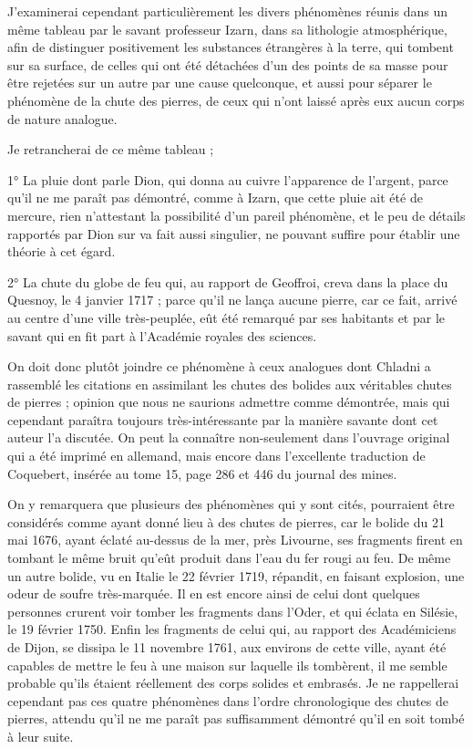 \documentclass[a4paper, 12pt, oneside, french]{article}
\begin{document}
J'examinerai cependant particulièrement les divers phénomènes réunis dans un même tableau par le savant professeur Izarn, dans sa lithologie atmosphérique, afin de distinguer positivement les substances étrangères à la terre, qui tombent sur sa surface, de celles qui ont été détachées d'un des points de sa masse pour être rejetées sur un autre par une cause quelconque, et aussi pour séparer le phénomène de la chute des pierres, de ceux qui n'ont laissé après eux aucun corps de nature analogue.

Je retrancherai de ce même tableau ;

1° La pluie dont parle Dion, qui donna au cuivre l'apparence de l'argent, parce qu'il ne me paraît pas démontré, comme à Izarn, que cette pluie ait été de mercure, rien n'attestant la possibilité d'un pareil phénomène, et le peu de détails rapportés par Dion sur va fait aussi singulier, ne pouvant suffire pour établir une théorie à cet égard.

2° La chute du globe de feu qui, au rapport de Geoffroi, creva dans la place du Quesnoy, le 4 janvier 1717 ; parce qu'il ne lança aucune pierre, car ce fait, arrivé au centre d'une ville très-peuplée, eût été remarqué par ses habitants et par le savant qui en fit part à l'Académie royales des sciences.

On doit donc plutôt joindre ce phénomène à ceux analogues dont Chladni a rassemblé les citations en assimilant les chutes des bolides aux véritables chutes de pierres ; opinion que nous ne saurions admettre comme démontrée, mais qui cependant paraîtra toujours très-intéressante par la manière savante dont cet auteur l'a discutée. On peut la connaître non-seulement dans l'ouvrage original qui a été imprimé en allemand, mais encore dans l'excellente traduction de Coquebert, insérée au tome 15, page 286 et 446 du journal des mines.

On y remarquera que plusieurs des phénomènes qui y sont cités, pourraient être considérés comme ayant donné lieu à des chutes de pierres, car le bolide du 21 mai 1676, ayant éclaté au-dessus de la mer, près Livourne, ses fragments firent en tombant le même bruit qu'eût produit dans l'eau du fer rougi au feu. De même un autre bolide, vu en Italie le 22 février 1719, répandit, en faisant explosion, une odeur de soufre très-marquée. Il en est encore ainsi de celui dont quelques personnes crurent voir tomber les fragments dans l'Oder, et qui éclata en Silésie, le 19 février 1750. Enfin les fragments de celui qui, au rapport des Académiciens de Dijon, se dissipa le 11 novembre 1761, aux environs de cette ville, ayant été capables de mettre le feu à une maison sur laquelle ils tombèrent, il me semble probable qu'ils étaient réellement des corps solides et embrasés. Je ne rappellerai cependant pas ces quatre phénomènes dans l'ordre chronologique des chutes de pierres, attendu qu'il ne me paraît pas suffisamment démontré qu'il en soit tombé à leur suite.
\end{document}
